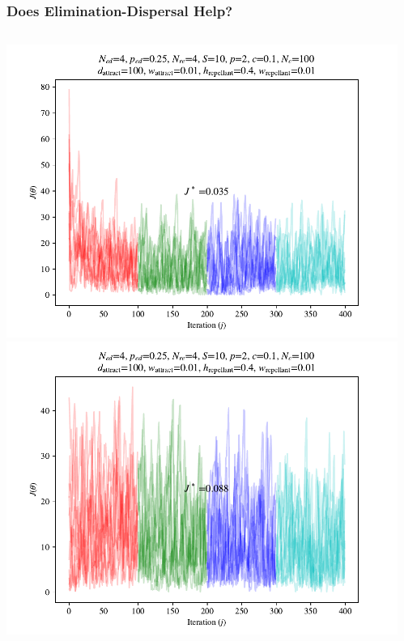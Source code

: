 \documentclass{beamer}
\begin{document}
\begin{frame}
\frametitle{Does Elimination-Dispersal Help?}
\begin{columns}[T]
    \begin{center}
      \includegraphics[scale=0.3]{assets/rastrigin_colony_ed_0_J}
      \includegraphics[scale=0.3]{assets/rastrigin_colony_ed_1_J}
    \end{center}
  \begin{center}

\end{center}
\end{columns}
\end{frame}
\end{document}
